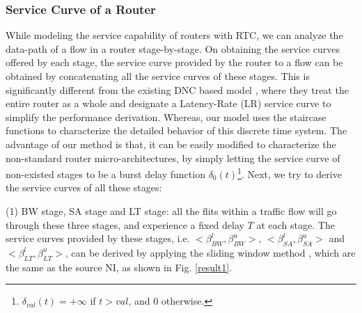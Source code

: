 \documentclass[preprint]{elsarticle}
\begin{document}
\subsubsection{Service Curve of a Router}\label{router}
While modeling the service capability of routers with RTC, we can analyze the data-path of a flow in a router stage-by-stage. On obtaining the service curves offered by each stage, the service curve provided by the router to a flow can be obtained by concatenating all the service curves of these stages. This is significantly different from the existing DNC based model \cite{qian2009analysis,Qian489900}, where they treat the entire router as a whole and designate a Latency-Rate (LR) service curve \cite{Boudec2001Network} to simplify the performance derivation. Whereas, our model uses the staircase functions to characterize the detailed behavior of this discrete time system. The advantage of our method is that, it can be easily modified to characterize the non-standard router micro-architectures, by simply letting the service curve of non-existed stages to be a burst delay function $\delta_0(t)$\footnote{$\delta_{val}(t)=+\infty$ if $t>val$, and 0 otherwise.}. Next, we try to derive the service curves of all these stages:

(1) BW stage, SA stage and LT stage: all the flits within a traffic flow will go through these three stages, and experience a fixed delay $T$ at each stage. The service curves provided by these stages, i.e. $<\beta^l_{BW},\beta^u_{BW}>$, $<\beta^l_{SA},\beta^u_{SA}>$ and $<\beta^l_{LT},\beta^u_{LT}>$, can be derived by applying the sliding window method \cite{1253607}, which are the same as the source NI, as shown in Fig. \ref{result1}.
\end{document}
